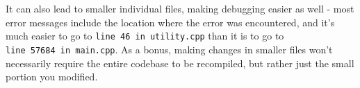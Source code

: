 It can also lead to smaller individual files, making debugging easier as
well - most error messages include the location where the error was
encountered, and it's much easier to go to
\texttt{line\ 46\ in\ utility.cpp} than it is to go to
\texttt{line\ 57684\ in\ main.cpp}. As a bonus, making changes in
smaller files won't necessarily require the entire codebase to be
recompiled, but rather just the small portion you modified.

